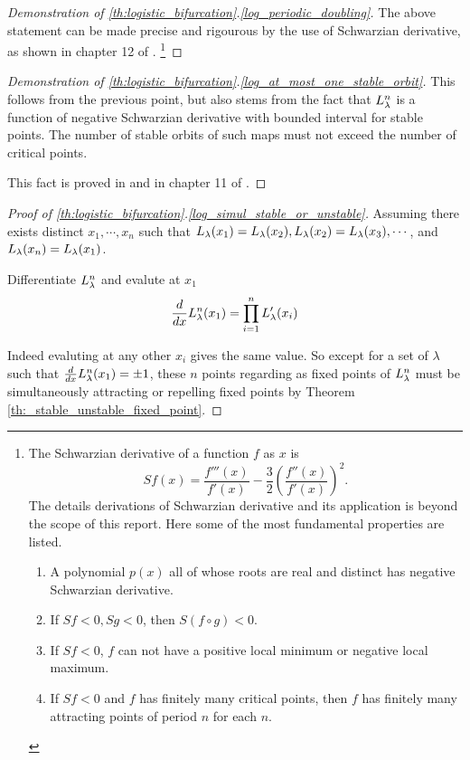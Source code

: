 \begin{proof}[Demonstration of \ref{th:logistic_bifurcation}.\ref{log_periodic_doubling}]
	The above statement can be made precise and rigourous by the use of Schwarzian derivative, as shown in chapter 12 of \cite{Devaney_green_book_chaos_definition}.
	\footnote{
		The Schwarzian derivative of a function $f$ as $x$ is 
		$$
		Sf(x) = \frac{f'''(x)}{f'(x)} - \frac{3}{2} \left(\frac{f''(x)}{f'(x)}\right)^2.
		$$
		The details derivations of Schwarzian derivative and its application is beyond the scope of this report. 
		Here some of the most fundamental properties are listed.
		\begin{enumerate}
			\item A polynomial $p(x)$ all of whose roots are real and distinct has negative Schwarzian derivative.
			\item If $Sf < 0, Sg < 0$, then $S(f\circ g) < 0$.
			\item If $Sf <0$, $f$ can not have a positive local minimum or negative local maximum.
			\item If $Sf < 0$ and $f$ has finitely many critical points, then $f$ has finitely many attracting points of period $n$ for each $n$.
		\end{enumerate}
	}
\end{proof}

\begin{proof}[Demonstration of \ref{th:logistic_bifurcation}.\ref{log_at_most_one_stable_orbit}]
	This follows from the previous point, but also stems from the fact that $L_{\lambda}^n$ is a function of negative Schwarzian derivative with bounded interval for stable points.
	The number of stable orbits of such maps must not exceed the number of critical points.

	This fact is proved in \cite{Pierre_Collet} and in chapter 11 of \cite{Devaney_green_book_chaos_definition}.
\end{proof}


\begin{proof}[Proof of \ref{th:logistic_bifurcation}.\ref{log_simul_stable_or_unstable}]
		Assuming there exists distinct $x_1, \cdots, x_n$ such that $L_{\lambda}(x_1) = L_{\lambda}(x_2), L_{\lambda}(x_2) = L_{\lambda}(x_3), \cdots $, and $L_{\lambda}(x_n) = L_{\lambda}(x_1)$.

		Differentiate $L_{\lambda}^n$ and evalute at $x_1$ 
		$$
		\frac{d}{dx} L_{\lambda}^n(x_1) = \prod_{i=1}^n L_{\lambda}'(x_i)
		$$

		Indeed evaluting at any other $x_i$ gives the same value. 
		So except for a set of $\lambda$ such that $\frac{d}{dx} L_{\lambda}^n(x_1) = \pm 1$, these $n$ points regarding as fixed points of $L_{\lambda}^n$ must be simultaneously attracting or repelling fixed points by Theorem \ref{th:_stable_unstable_fixed_point}.
\end{proof}

